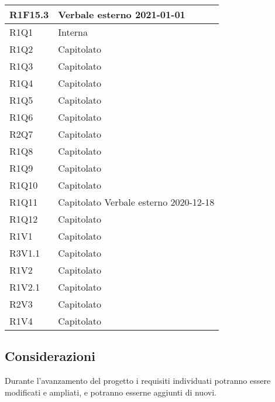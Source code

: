 \begin{center}
\begin{longtable}{|p{22mm}|p{22mm}|}
	\hline
R1F15.3	& Verbale esterno 2021-01-01 \\
	\hline
R1Q1	& Interna\\
	\hline
R1Q2	& Capitolato\\
\hline
R1Q3	& Capitolato\\
\hline
R1Q4	& Capitolato\\
\hline
R1Q5	& Capitolato\\
\hline
R1Q6	& Capitolato\\
\hline
R2Q7	& Capitolato\\
\hline
R1Q8	& Capitolato\\
\hline
R1Q9	& Capitolato\\
\hline
R1Q10	& Capitolato\\
\hline
R1Q11	& Capitolato\newline	
Verbale esterno 2020-12-18 
\\
\hline
R1Q12	& Capitolato\\
\hline
R1V1	& Capitolato\\
	\hline
R3V1.1	& Capitolato\\
	\hline
R1V2	& Capitolato\\
	\hline
R1V2.1	& Capitolato\\
	\hline
R2V3	& Capitolato\\
	\hline
R1V4	& Capitolato\\
	\hline
	
	\end{longtable}
\end{center}

\subsection{Considerazioni}
Durante l'avanzamento del progetto i requisiti individuati potranno essere modificati e ampliati, e potranno esserne aggiunti di nuovi.